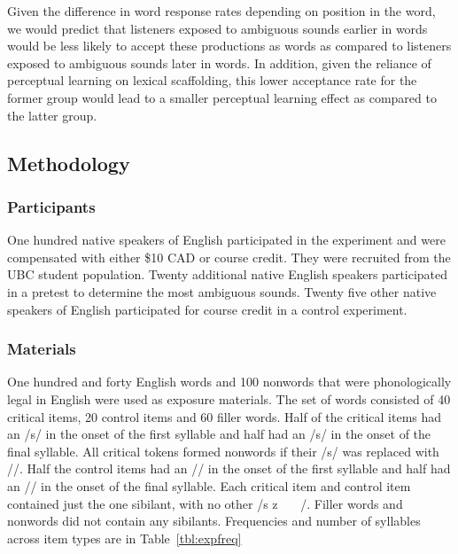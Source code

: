 Given the difference in word response rates depending on position in the word, we would predict that listeners exposed to ambiguous sounds earlier in words would be less likely to accept these productions as words as compared to listeners exposed to ambiguous sounds later in words.  
In addition, given the reliance of perceptual learning on lexical scaffolding, this lower acceptance rate for the former group would lead to a smaller perceptual learning effect as compared to the latter group.

\subsection{Methodology}

\subsubsection{Participants}

One hundred native speakers of English participated in the experiment and were compensated with either \$10 CAD or course credit. 
They were recruited from the UBC student population.  
Twenty additional native English speakers participated in a pretest to determine the most ambiguous sounds.  
Twenty five other native speakers of English participated for course credit in a control experiment.

\subsubsection{Materials}

One hundred and forty English words and 100 nonwords that were phonologically legal in English were used as exposure materials.  
The set of words consisted of 40 critical items, 20 control items and 60 filler words.  
Half of the critical items had an /s/ in the onset of the first syllable and half had an /s/ in the onset of the final syllable.  
All critical tokens formed nonwords if their /s/ was replaced with /\textesh/. Half the control items had an /\textesh/ in the onset of the first syllable and half had an /\textesh/ in the onset of the final syllable.  
Each critical item and control item contained just the one sibilant, with no other /s z \textesh\ \textyogh\ \textteshlig\  \textdyoghlig/.  
Filler words and nonwords did not contain any sibilants.  
Frequencies and number of syllables across item types are in Table~\ref{tbl:expfreq}

